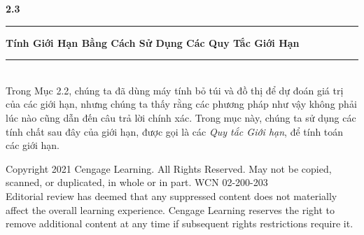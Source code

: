 \noindent
\begin{minipage}[c]{0.22\textwidth}
  \hspace{0.4em}%
  {\fontsize{24}{26}\selectfont\sffamily\bfseries\color{stewartcyan}2.3}
\end{minipage}%
{\color{stewartcyan}\rule[-6pt]{1.4pt}{28pt}}%
\hspace{0.8em}%
\begin{minipage}[c]{0.73\textwidth}
  {\fontsize{15}{18}\selectfont\sffamily\bfseries Tính Giới Hạn Bằng Cách Sử Dụng Các Quy Tắc Giới Hạn}
\end{minipage}

\vspace{1.2em}

\noindent
\hspace*{0.245\textwidth}%
\begin{minipage}[t]{0.755\textwidth}
  {\color{stewartcyan}\rule{1.1ex}{1.1ex}}\\[0.4em]
  \fontsize{9.5}{13.5}\selectfont
  Trong Mục 2.2, chúng ta đã dùng máy tính bỏ túi và đồ thị để dự đoán giá trị của các giới hạn, nhưng chúng ta thấy rằng các phương pháp như vậy không phải lúc nào cũng dẫn đến câu trả lời chính xác. Trong mục này, chúng ta sử dụng các tính chất sau đây của giới hạn, được gọi là các \textit{Quy tắc Giới hạn}, để tính toán các giới hạn.
\end{minipage}

\vfill
\begin{center}
  \fontsize{6}{7.5}\selectfont\color{gray}
  Copyright 2021 Cengage Learning. All Rights Reserved. May not be copied, scanned, or duplicated, in whole or in part. WCN 02-200-203\\
  Editorial review has deemed that any suppressed content does not materially affect the overall learning experience. Cengage Learning reserves the right to remove additional content at any time if subsequent rights restrictions require it.
\end{center}
